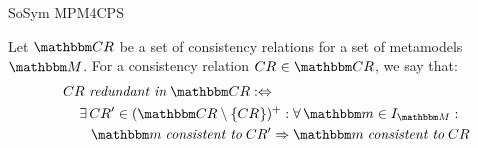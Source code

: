 \begin{copiedFrom}{SoSym MPM4CPS}
\begin{definition}
\label{def:redundancy}
    Let $\consistencyrelationset{CR}$ be a set of consistency relations for a set of metamodels $\metamodelset{M}$. %
    For a consistency relation $\consistencyrelation{CR}{} \in \consistencyrelationset{CR}$, we say that:
    \begin{align*}
        \formulaskip &
        \consistencyrelation{CR}{} \redundantinmath \consistencyrelationset{CR} \equivalentperdefinition\\
        & \formulaskip 
        \exists \consistencyrelation{CR'}{} \in \transitiveclosure{(\consistencyrelationset{CR} \setminus \setted{\consistencyrelation{CR}{}})} : 
        \forall \modelset{m} \in \metamodelinstances{\metamodelset{M}} :\\
        & \formulaskip\formulaskip
        \modelset{m} \consistenttomath \consistencyrelation{CR'}{} \Rightarrow \modelset{m} \consistenttomath \consistencyrelation{CR}{}
    \end{align*}

\end{definition}
\end{copiedFrom}
